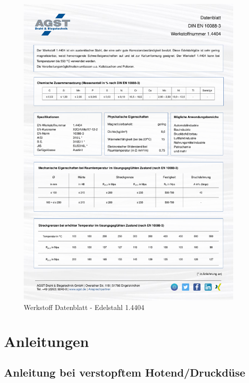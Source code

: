   \begin{figure}[ht]
    \centering
    \includegraphics[width=1\textwidth]{bilder/Werkstoff_Datenblatt_1.4404.pdf}
    \caption{Werkstoff Datenblatt - Edelstahl 1.4404 \autocite{AGSTSteel:1.4404}}
    \label{Datenblatt1.4404}
  \end{figure}
  \FloatBarrier
  

\section{Anleitungen}
\subsection*{Anleitung bei verstopftem Hotend/Druckdüse}

